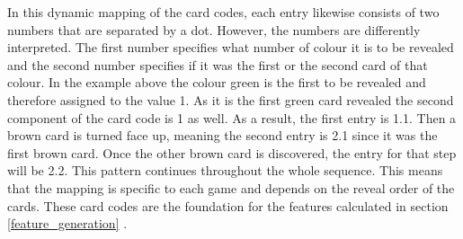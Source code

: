 In this dynamic mapping of the card codes, each entry likewise consists of two numbers that are separated by a dot. However, the numbers are differently interpreted. The first number specifies what number of colour it is to be revealed and the second number specifies if it was the first or the second card of that colour. In the example above the colour green is the first to be revealed and therefore assigned to the value 1. As it is the first green card revealed the second component of the card code is 1 as well. As a result, the first entry is 1.1. Then a brown card is turned face up, meaning the second entry is 2.1 since it was the first brown card. Once the other brown card is discovered, the entry for that step will be 2.2. This pattern continues throughout the whole sequence. This means that the mapping is specific to each game and depends on the reveal order of the cards. These card codes are the foundation for the features calculated in section \ref{feature_generation} .




